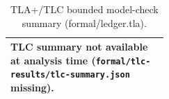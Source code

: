 
\begin{table}[htbp]
\centering
\small
\caption{TLA+/TLC bounded model-check summary (formal/ledger.tla).}
\label{tab:tlc}
\begin{tabular}{llp{0.45\linewidth}}
\toprule
\multicolumn{3}{l}{TLC summary not available at analysis time (\texttt{formal/tlc-results/tlc-summary.json} missing).} \\
\bottomrule
\end{tabular}
\end{table}
